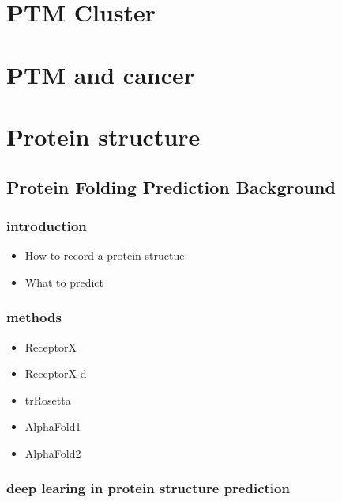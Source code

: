 \documentclass[
]{book}
\providecommand{\tightlist}{%
  \setlength{\itemsep}{0pt}\setlength{\parskip}{0pt}}
\begin{document}
\hypertarget{ptm-cluster}{%
\section{PTM Cluster}\label{ptm-cluster}}

\hypertarget{ptm-and-cancer}{%
\section{PTM and cancer}\label{ptm-and-cancer}}

\hypertarget{protein-structure}{%
\section{Protein structure}\label{protein-structure}}

\hypertarget{protein-folding-prediction-background}{%
\subsection{Protein Folding Prediction Background}\label{protein-folding-prediction-background}}

\hypertarget{introduction}{%
\subsubsection{introduction}\label{introduction}}

\begin{itemize}
\item
  How to record a protein structue
\item
  What to predict
\end{itemize}

\hypertarget{methods}{%
\subsubsection{methods}\label{methods}}

\begin{itemize}
\tightlist
\item
  ReceptorX
\item
  ReceptorX-d
\item
  trRosetta
\item
  AlphaFold1
\item
  AlphaFold2
\end{itemize}

\hypertarget{deep-learing-in-protein-structure-prediction}{%
\subsubsection{deep learing in protein structure prediction}\label{deep-learing-in-protein-structure-prediction}}
\end{document}

